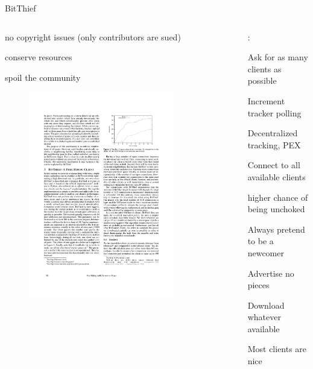 \begin{frame}{BitThief}

\begin{columns}
\begin{column}{0.44\textwidth}
\BI
\item no copyright issues (only contributors are sued)
\item conserve resources
\item spoil the community
\EI

\bigskip
\begin{figure}
\includegraphics[width=0.8\textwidth]{figs/10/bitthief1}
\end{figure}
\end{column}
\begin{column}{0.56\textwidth}
:
\BI
\item Ask for as many clients as possible
	\BI
	\item Increment tracker polling
	\item Decentralized tracking, PEX
	\EI
\item Connect to all available clients
	\BI
	\item higher chance of being unchoked
	\EI
\item Always pretend to be a newcomer
	\BI
	\item Advertise no pieces
	\item Download whatever available
	\item Most clients are nice
	\EI
\EI


\end{column}
\end{columns}
\end{frame}
